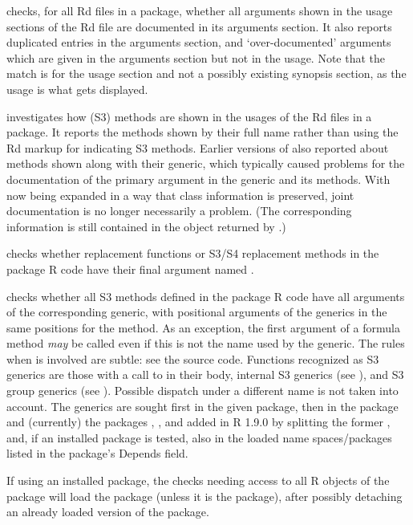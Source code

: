 \begin{Details}\relax
{} checks, for all Rd files in a package, whether all
arguments shown in the usage sections of the Rd file are documented in
its arguments section.  It also reports duplicated entries in the
arguments section, and `over-documented' arguments which are
given in the arguments section but not in the usage.  Note that the
match is for the usage section and not a possibly existing synopsis
section, as the usage is what gets displayed.

 investigates how (S3) methods are shown in the
usages of the Rd files in a package.  It reports the methods shown by
their full name rather than using the Rd  markup for
indicating S3 methods.  Earlier versions of \R{} also reported about
methods shown along with their generic, which typically caused
problems for the documentation of the primary argument in the generic
and its methods.  With  now being expanded in a way
that class information is preserved, joint documentation is
no longer necessarily a problem.  (The corresponding information is
still contained in the object returned by .)

 checks whether replacement functions or S3/S4
replacement methods in the package R code have their final argument
named .

 checks whether all S3 methods defined in the
package R code have all arguments of the corresponding generic, with
positional arguments of the generics in the same positions for the
method.  As an exception, the first argument of a formula method
\emph{may} be called  even if this is not the name used
by the generic.  The rules when  is involved are subtle:
see the source code.  Functions recognized as S3 generics are those
with a call to  in their body, internal S3 generics
(see ), and S3 group generics (see
).  Possible dispatch under a
different name is not taken into account.  The generics are sought
first in the given package, then in the  package and
(currently) the packages , , and 
added in R 1.9.0 by splitting the former , and, if an
installed package is tested, also in the loaded name spaces/packages
listed in the package's  Depends field.

If using an installed package, the checks needing access to all R
objects of the package will load the package (unless it is the
 package), after possibly detaching an already loaded
version of the package.
\end{Details}
